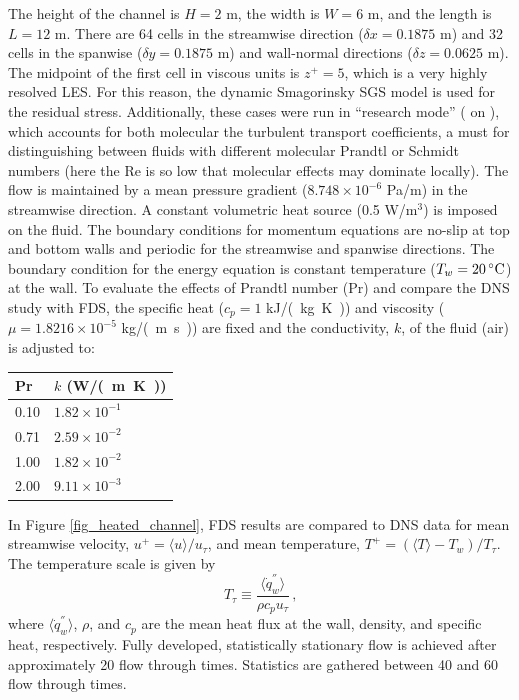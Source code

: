 \documentclass[11pt]{book}
\begin{document}
The height of the channel is $H=2$ m, the width is $W=6$ m, and the length is $L=12$ m. There are 64 cells in the streamwise direction ($\delta x = 0.1875$ m) and 32 cells in the spanwise ($\delta y=0.1875$ m) and wall-normal directions ($\delta z=0.0625$ m).  The midpoint of the first cell in viscous units is $z^+ = 5$, which is a very highly resolved LES. For this reason, the dynamic Smagorinsky SGS model is used for the residual stress. Additionally, these cases were run in ``research mode'' ( on ), which accounts for both molecular the turbulent transport coefficients, a must for distinguishing between fluids with different molecular Prandtl or Schmidt numbers (here the Re is so low that molecular effects may dominate locally).  The flow is maintained by a mean pressure gradient ($8.748 \times 10^{-6}$ Pa/m) in the streamwise direction. A constant volumetric heat source (0.5 W/m$^3$) is imposed on the fluid. The boundary conditions for momentum equations are no-slip at top and bottom walls and periodic for the streamwise and spanwise directions. The boundary condition for the energy equation is constant temperature ($T_w = 20 \,\mbox{\si{\degree C}} $) at the wall. To evaluate the effects of Prandtl number (Pr) and compare the DNS study \cite{Kim:1987} with FDS, the specific heat ($c_p = 1$ \si{kJ/(kg.K)}) and viscosity ($\mu = 1.8216 \times 10^{-5}$ \si{kg/(m.s)}) are fixed and the conductivity, $k$, of the fluid (air) is adjusted to:
\begin{center}
\begin{tabular}{ll}
Pr & $k$ (\si{W/(m.K)}) \\
\hline
0.10 & $1.82 \times 10^{-1}$ \\
0.71 & $2.59 \times 10^{-2}$ \\
1.00 & $1.82 \times 10^{-2}$ \\
2.00 & $9.11 \times 10^{-3}$
\end{tabular}
\end{center}

In Figure \ref{fig_heated_channel}, FDS results are compared to DNS data for mean streamwise velocity, $u^+ = \langle u \rangle/u_\tau$, and mean temperature, $T^+ = (\langle T \rangle - T_w)/T_\tau$. The temperature scale is given by
\begin{equation}
\label{eqn_friction_temperature}
T_{\tau} \equiv \frac{\langle \dot{q}_w^{''} \rangle}{{\rho}{c_p}{u_{\tau}}} \,\mbox{,}
\end{equation}
where $\langle \dot{q}_w^{''} \rangle$, $\rho$, and $c_p$ are the mean heat flux at the wall, density, and specific heat, respectively.  Fully developed, statistically stationary flow is achieved after approximately 20 flow through times.  Statistics are gathered between 40 and 60 flow through times.
\end{document}
